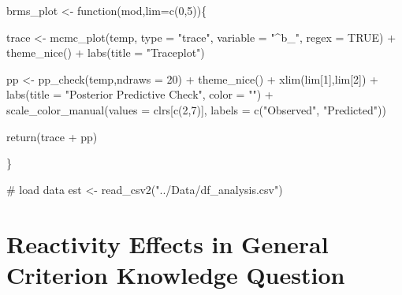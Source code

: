 \documentclass[
  letterpaper,
  DIV=11,
  numbers=noendperiod]{scrartcl}
\newenvironment{Shaded}{\begin{snugshade}}{\end{snugshade}}
\newcommand{\AttributeTok}[1]{\textcolor[rgb]{0.40,0.45,0.13}{#1}}
\newcommand{\CommentTok}[1]{\textcolor[rgb]{0.37,0.37,0.37}{#1}}
\newcommand{\ConstantTok}[1]{\textcolor[rgb]{0.56,0.35,0.01}{#1}}
\newcommand{\ControlFlowTok}[1]{\textcolor[rgb]{0.00,0.23,0.31}{#1}}
\newcommand{\DecValTok}[1]{\textcolor[rgb]{0.68,0.00,0.00}{#1}}
\newcommand{\FunctionTok}[1]{\textcolor[rgb]{0.28,0.35,0.67}{#1}}
\newcommand{\NormalTok}[1]{\textcolor[rgb]{0.00,0.23,0.31}{#1}}
\newcommand{\OtherTok}[1]{\textcolor[rgb]{0.00,0.23,0.31}{#1}}
\newcommand{\SpecialCharTok}[1]{\textcolor[rgb]{0.37,0.37,0.37}{#1}}
\newcommand{\StringTok}[1]{\textcolor[rgb]{0.13,0.47,0.30}{#1}}
\begin{document}
\begin{Shaded}
\begin{Highlighting}[]
\NormalTok{brms\_plot }\OtherTok{\textless{}{-}} \ControlFlowTok{function}\NormalTok{(mod,}\AttributeTok{lim=}\FunctionTok{c}\NormalTok{(}\DecValTok{0}\NormalTok{,}\DecValTok{5}\NormalTok{))\{}
  

\NormalTok{  trace }\OtherTok{\textless{}{-}}   \FunctionTok{mcmc\_plot}\NormalTok{(temp, }\AttributeTok{type =} \StringTok{"trace"}\NormalTok{, }\AttributeTok{variable =} \StringTok{"\^{}b\_"}\NormalTok{, }\AttributeTok{regex =} \ConstantTok{TRUE}\NormalTok{) }\SpecialCharTok{+}
              \FunctionTok{theme\_nice}\NormalTok{() }\SpecialCharTok{+}
              \FunctionTok{labs}\NormalTok{(}\AttributeTok{title =} \StringTok{"Traceplot"}\NormalTok{)}

\NormalTok{  pp    }\OtherTok{\textless{}{-}}  \FunctionTok{pp\_check}\NormalTok{(temp,}\AttributeTok{ndraws =} \DecValTok{20}\NormalTok{) }\SpecialCharTok{+} 
              \FunctionTok{theme\_nice}\NormalTok{() }\SpecialCharTok{+} \FunctionTok{xlim}\NormalTok{(lim[}\DecValTok{1}\NormalTok{],lim[}\DecValTok{2}\NormalTok{]) }\SpecialCharTok{+}
              \FunctionTok{labs}\NormalTok{(}\AttributeTok{title =} \StringTok{"Posterior Predictive Check"}\NormalTok{, }\AttributeTok{color =} \StringTok{""}\NormalTok{) }\SpecialCharTok{+}
              \FunctionTok{scale\_color\_manual}\NormalTok{(}\AttributeTok{values =}\NormalTok{ clrs[}\FunctionTok{c}\NormalTok{(}\DecValTok{2}\NormalTok{,}\DecValTok{7}\NormalTok{)], }\AttributeTok{labels =} \FunctionTok{c}\NormalTok{(}\StringTok{"Observed"}\NormalTok{, }\StringTok{"Predicted"}\NormalTok{))}


  \FunctionTok{return}\NormalTok{(trace }\SpecialCharTok{+}\NormalTok{ pp)}

  
\NormalTok{\}}
\end{Highlighting}
\end{Shaded}

\begin{Shaded}
\begin{Highlighting}[]
\CommentTok{\# load data}
\NormalTok{est }\OtherTok{\textless{}{-}} \FunctionTok{read\_csv2}\NormalTok{(}\StringTok{"../Data/df\_analysis.csv"}\NormalTok{)}
\end{Highlighting}
\end{Shaded}

\section{Reactivity Effects in General Criterion Knowledge
Question}\label{reactivity-effects-in-general-criterion-knowledge-question}
\end{document}
